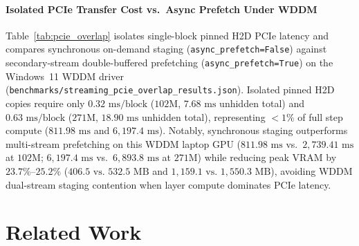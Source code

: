 \documentclass[10pt,twocolumn,letterpaper]{article}
\begin{document}
\paragraph{Isolated PCIe Transfer Cost vs.\ Async Prefetch Under WDDM} Table~\ref{tab:pcie_overlap} isolates single-block pinned H2D PCIe latency and compares synchronous on-demand staging (\texttt{async\_prefetch=False}) against secondary-stream double-buffered prefetching (\texttt{async\_prefetch=True}) on the Windows~11 WDDM driver (\texttt{benchmarks/streaming\_pcie\_overlap\_results.json}). Isolated pinned H2D copies require only $0.32\text{ ms/block}$ ($102\text{M}$, $7.68\text{ ms}$ unhidden total) and $0.63\text{ ms/block}$ ($271\text{M}$, $18.90\text{ ms}$ unhidden total), representing $<1\%$ of full step compute ($811.98\text{ ms}$ and $6,197.4\text{ ms}$). Notably, synchronous staging outperforms multi-stream prefetching on this WDDM laptop GPU ($811.98\text{ ms}$ vs.\ $2,739.41\text{ ms}$ at $102\text{M}$; $6,197.4\text{ ms}$ vs.\ $6,893.8\text{ ms}$ at $271\text{M}$) while reducing peak VRAM by $23.7\%$--$25.2\%$ ($406.5\text{ vs.\ }532.5\text{ MB}$ and $1,159.1\text{ vs.\ }1,550.3\text{ MB}$), avoiding WDDM dual-stream staging contention when layer compute dominates PCIe latency.

\begin{table}[t]
\centering
\small
\caption{\textbf{PCIe Pinned H2D Latency vs.\ Async Prefetch Ablation on Windows WDDM RTX~5070} ($B=2, T=512$, BF16; \texttt{streaming\_pcie\_overlap\_results.json}).}
\label{tab:pcie_overlap}
\end{table}

\section{Related Work}
\end{document}
